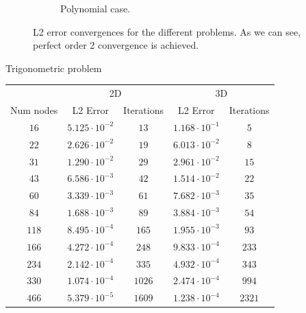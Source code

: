 \begin{figure}
\begin{subfigure}{0.49\textwidth}
        \caption{Polynomial case.}
    \end{subfigure}
    \caption{L2 error convergences for the different problems. As we can see, perfect order 2 convergence is achieved.}
    \label{fig:convergence}
\end{figure}
\begin{table}
    \centering
    \begin{subtable}{\textwidth}
        \centering
        \begin{Large}
            Trigonometric problem
        \end{Large}
        \begin{small}
            \begin{tabular}{ccc@{\hskip 1cm}cc}
                \toprule
                & \multicolumn{2}{c}{2D\hphantom{asdf}} & \multicolumn{2}{c}{3D} \\
                Num nodes & L2 Error & Iterations & L2 Error & Iterations \\
                \cmidrule(lr{1cm}){2-3}\cmidrule(r){4-5}
                \( 16\)   &  \(5.125\cdot 10^{-2}\)  & \(  13\)  &  \(1.168\cdot 10^{-1}\) & \(   5\) \\
                \( 22\)   &  \(2.626\cdot 10^{-2}\)  & \(  19\)  &  \(6.013\cdot 10^{-2}\) & \(   8\) \\
                \( 31\)   &  \(1.290\cdot 10^{-2}\)  & \(  29\)  &  \(2.961\cdot 10^{-2}\) & \(  15\) \\
                \( 43\)   &  \(6.586\cdot 10^{-3}\)  & \(  42\)  &  \(1.514\cdot 10^{-2}\) & \(  22\) \\
                \( 60\)   &  \(3.339\cdot 10^{-3}\)  & \(  61\)  &  \(7.682\cdot 10^{-3}\) & \(  35\) \\
                \( 84\)   &  \(1.688\cdot 10^{-3}\)  & \(  89\)  &  \(3.884\cdot 10^{-3}\) & \(  54\) \\
                \(118\)   &  \(8.495\cdot 10^{-4}\)  & \( 165\)  &  \(1.955\cdot 10^{-3}\) & \(  93\) \\
                \(166\)   &  \(4.272\cdot 10^{-4}\)  & \( 248\)  &  \(9.833\cdot 10^{-4}\) & \( 233\) \\
                \(234\)   &  \(2.142\cdot 10^{-4}\)  & \( 335\)  &  \(4.932\cdot 10^{-4}\) & \( 343\) \\
                \(330\)   &  \(1.074\cdot 10^{-4}\)  & \(1026\)  &  \(2.474\cdot 10^{-4}\) & \( 994\) \\
                \(466\)   &  \(5.379\cdot 10^{-5}\)  & \(1609\)  &  \(1.238\cdot 10^{-4}\) & \(2321\) \\

\end{tabular}
\end{small}
\end{subtable}
\end{table}
